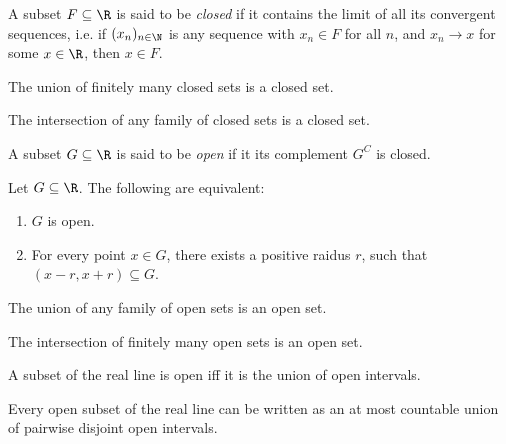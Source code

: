 \documentclass{article}
\begin{document}
\begin{definition}
    A subset $F\subseteq\R$ is said to be \emph{closed} if it contains the limit of all
    its convergent sequences, i.e. if $(x_n)_{n\in\N}$ is any sequence with $x_n\in F$
    for all $n$, and $x_n\to x$ for some $x\in\R$, then $x\in F$.
\end{definition}

\begin{proposition}[Notes 2.2]
    The union of finitely many closed sets is a closed set.
\end{proposition}

\begin{proposition}[Notes 2.4]
    The intersection of any family of closed sets is a closed set.
\end{proposition}

\begin{definition}
    A subset $G\subseteq\R$ is said to be \emph{open} if it its complement $G^C$ is closed.
\end{definition}

\begin{proposition}[Notes 2.6]
    Let $G\subseteq\R$. The following are equivalent:
    \begin{enumerate}
        \item $G$ is open.
        \item For every point $x\in G$, there exists a positive raidus $r$, such that
              $(x-r,x+r)\subseteq G$.
    \end{enumerate}
\end{proposition}

\begin{proposition}[Notes 2.8]
    The union of any family of open sets is an open set.
\end{proposition}

\begin{proposition}[Notes 2.9]
    The intersection of finitely many open sets is an open set.
\end{proposition}

\begin{theorem}[Notes 2.10]
    A subset of the real line is open iff it is the union of open intervals.
\end{theorem}

\begin{theorem}[Notes 2.11]
    Every open subset of the real line can be written as an at most countable union
    of pairwise disjoint open intervals.
\end{theorem}
\end{document}
